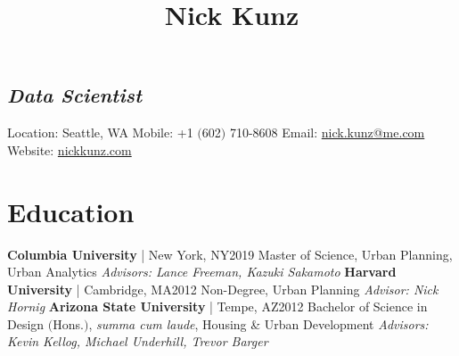 \documentclass{article}
\title{
    \vspace{-48pt}
    \textbf{Nick Kunz}
    \vspace{-56pt}
}
\date{}
\begin{document}
    \maketitle
    \subsection*{\textit{Data Scientist}}
        Location: \space\space\space Seattle, WA\newline
        Mobile: \space\space\space\space\space+1 $($602$)$ 710-8608\newline
        Email: \space\space\space\space\space\space\url{nick.kunz@me.com}\newline
        Website: \space\space\space\space\url{nickkunz.com}
    \section*{Education}
        \textbf{Columbia University} | New York, NY\hfill{2019}\newline
        Master of Science, Urban Planning, Urban Analytics\newline
        \textit{Advisors: Lance Freeman, Kazuki Sakamoto}\newline\newline
        \textbf{Harvard University} | Cambridge, MA\hfill{2012}\newline
        Non-Degree, Urban Planning\newline
        \textit{Advisor: Nick Hornig}\newline\newline
        \textbf{Arizona State University} | Tempe, AZ\hfill{2012}\newline 
        Bachelor of Science in Design $($Hons.$)$, \textit{summa cum laude}, Housing \& Urban Development\newline
        \textit{Advisors: Kevin Kellog, Michael Underhill, Trevor Barger}
\end{document}
